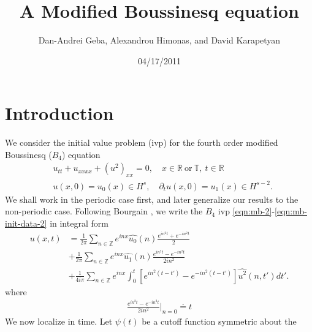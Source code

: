 \documentclass[12pt,reqno]{amsart}
\numberwithin{equation}{section}  %
\newcommand{\rr}{\mathbb{R}}
\newcommand{\zz}{\mathbb{Z}}
\newcommand{\ci}{\mathbb{T}}
\newcommand{\wh}{\widehat}
\newcommand{\p}{\partial}
\begin{document}
\title{A Modified Boussinesq equation}
\author{Dan-Andrei Geba, Alexandrou Himonas, and David Karapetyan}
\address{Department of Mathematics, University of Rochester, Rochester, NY 14627}
\address{Department of Mathematics, University of Notre Dame, Notre Dame, IN 46556}
\address{Department of Mathematics, University of Notre Dame, Notre Dame, IN 46556}
\date{04/17/2011}
%
%
\maketitle
\tableofcontents
%
%
\section{Introduction}
%
%
%
We consider the initial value problem (ivp) for the fourth order modified Boussinesq
($B_4$) equation 
\begin{align}
  & u_{tt} + u_{xxxx} + (u^2)_{xx} = 0, \quad x \in \rr \ \text{or} \
  \ci, \ t \in \rr
  \label{eqn:mb-2}
  \\
  & u(x,0) = u_{0}(x) \in H^{s}, \quad \p_t u(x, 0) = u_1(x) \in H^{s-2}.
  \label{eqn:mb-init-data-2}
  \end{align}
%
%
We shall work in the periodic case first, and later generalize our results to
the non-periodic case. Following Bourgain \cite{Bourgain-Fourier-transfo}, we
write the $B_4$ ivp
\eqref{eqn:mb-2}-\eqref{eqn:mb-init-data-2} in integral form
%
%
%
\begin{equation}
  \begin{split}
    u(x,t)
    & = \frac{1}{2\pi}\sum_{n \in \zz} e^{inx} \wh{u_{0}}(n) \frac{e^{in^{2}t} + e^{-in^{2}t}}{2} 
    \\
    & + \frac{1}{2 \pi}\sum_{n \in \zz} e^{inx}
    \wh{u_{1}}(n)\frac{e^{in^{2}t} - e^{-in^{2}t}}{2 i n^{2}} 
    \\
    & + \frac{1}{4 i \pi}\sum_{n \in \zz} e^{inx}
    \int_{0}^{t}[e^{in^{2}(t-t')}-e^{-in^{2}(t-t')}]
    \wh{u^{2}}(n, t') dt'.
  \end{split}
  \label{eqn:integral-form}
\end{equation}
%
where
%
%
\begin{equation*}
\begin{split}
  \frac{e^{in^{2}t} - e^{-in^{2}t}}{2 i n^{2}} \vert_{n=0} \doteq t 
\end{split}
\end{equation*}
%
%
We now localize in time. Let $\psi(t)$ be a cutoff function symmetric about the 
\end{document}
